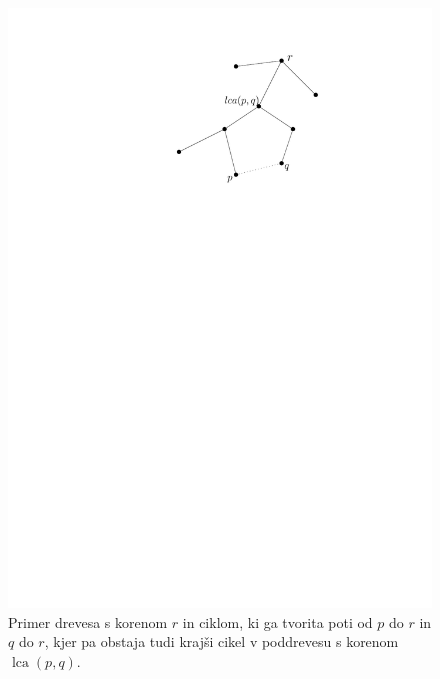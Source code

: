 \documentclass[a4paper, 12pt]{book}
\begin{document}
\begin{figure}[htp]
\centerline{\includegraphics[scale=0.9]{pics/lca.pdf}}
\caption{Primer drevesa s korenom $r$ in ciklom, ki ga tvorita poti od $p$ do $r$ in $q$ do $r$, kjer pa obstaja tudi krajši cikel v poddrevesu s korenom $\operatorname{lca}(p,q)$.}
\label{fig:lca}
\end{figure}



\end{document}

